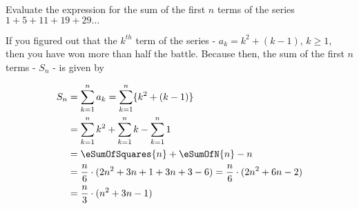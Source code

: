 
%
%
%
%
% 
% 

\question Evaluate the expression for the sum of the first $n$ terms of the 
series $1 + 5 + 11 + 19 + 29 \ldots$

\insertQR{}

\ifprintanswers
\fi 

\begin{solution}
	If you figured out that the $k^{th}$ term of the series - $a_k = k^2 + (k-1),\, k \geq 1$, then
	you have won more than half the battle. Because then, the sum of the first $n$ terms - $S_n$ -
	is given by
	
	\begin{align}
		S_n &= \sum_{k=1}^{n}a_k = \sum_{k=1}^{n}\lbrace k^2 + (k-1)\rbrace \\
		&= \sum_{k=1}^{n}k^2 + \sum_{k=1}^{n}k - \sum_{k=1}^{n}1 \\
		&= \eSumOfSquares{n} + \eSumOfN{n} - n \\
		&= \dfrac{n}{6}\cdot(2n^2+3n+1 + 3n+3 - 6) = \dfrac{n}{6}\cdot(2n^2+6n-2) \\
		&= \dfrac{n}{3}\cdot(n^2+3n-1)
	\end{align}
\end{solution}
